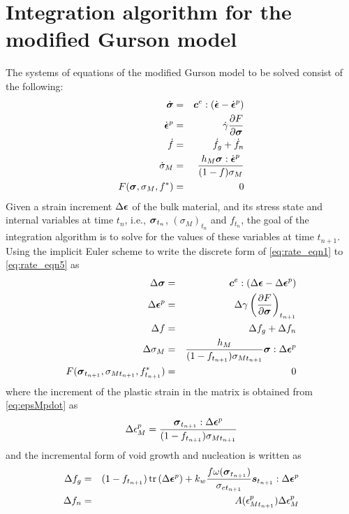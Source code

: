 
\section{Integration algorithm for the modified Gurson model}\label{implicit}
The systems of equations of the modified Gurson model to be solved consist of the following:
\begin{eqnarray}
	\dot{{\boldsymbol{\sigma}}} &=& {\boldsymbol{c}}^e : \left(
        \dot{{\boldsymbol{\epsilon}}} -
        \dot{{\boldsymbol{\epsilon}}}^p\right) \label{eq:rate_eqn1}
        \\ \dot{{\boldsymbol{\epsilon}}}^p &=& \dot{\gamma}\frac{\partial
          F}{\partial{\boldsymbol{\sigma}}} \label{eq:rate_eqn2}\\ \dot{f} &=&
        \dot{f}_g + \dot{f}_n \label{eq:rate_eqn3}\\ \dot{\sigma}_M
        &=& \frac{h_M{\boldsymbol{\sigma}} :
          \dot{{\boldsymbol{\epsilon}}}^p}{(1-f)\sigma_M} \label{eq:rate_eqn4}\\ F({\boldsymbol{\sigma}},
        \sigma_M, f^*) &=& 0 \label{eq:rate_eqn5}
\end{eqnarray}
Given a strain increment $\Delta{\boldsymbol{\epsilon}}$ of the bulk material,
and its stress state and internal variables at time $t_n$, i.e.,
${\boldsymbol{\sigma}}_{t_n}$, $(\sigma_M)_{t_n}$ and $f_{t_n}$, the goal of
the integration algorithm is to solve for the values of these
variables at time $t_{n+1}$. Using the implicit Euler scheme to write
the discrete form of \eqref{eq:rate_eqn1} to \eqref{eq:rate_eqn5} as
\begin{eqnarray}
	\Delta{\boldsymbol{\sigma}} &=& {\boldsymbol{c}}^e : \left( \Delta{\boldsymbol{\epsilon}} -  \Delta{\boldsymbol{\epsilon}}^p\right)  \label{eq:dis_eqn1} \\
	\Delta{\boldsymbol{\epsilon}}^p &=&\Delta\gamma\left( \frac{\partial F}{\partial{\boldsymbol{\sigma}}} \right) _{t_{n+1}} \label{eq:dis_eqn2}\\	
	\Delta f &=&\Delta f_g + \Delta f_n \label{eq:dis_eqn3}\\	
	\Delta\sigma_M &=& \frac{h_M}{(1-f_{t_{n+1}})\sigma_{Mt_{n+1}}}{\boldsymbol{\sigma}}:\Delta{\boldsymbol{\epsilon}}^p \label{eq:dis_eqn4}\\	
	F( {\boldsymbol{\sigma}}_{t_{n+1}}, \sigma_{Mt_{n+1}}, f^*_{t_{n+1}}) &=& 0 \label{eq:dis_eqn5}
\end{eqnarray}
where the increment of the plastic strain in the matrix is obtained from \eqref{eq:epsMpdot} as
\begin{equation}
\Delta\epsilon_M^p = \frac{{\boldsymbol{\sigma}}_{t_{n+1}}:\Delta{\boldsymbol{\epsilon}}^p}{(1-f_{t_{n+1}})\sigma_{Mt_{n+1}}}
\end{equation}
and the incremental form of void growth and nucleation is written as
\begin{eqnarray}
	\Delta f_g &=& (1-f_{t_{n+1}}) \operatorname{\text{tr}} \left( \Delta{\boldsymbol{\epsilon}}^p\right) + k_w\frac{f \omega({\boldsymbol{\sigma}}_{t_{n+1}})}{\sigma_{et_{n+1}}}{\boldsymbol{s}}_{t_{n+1}}: \Delta{\boldsymbol{\epsilon}}^p \\
	\Delta f_n &=&  A(\epsilon_{Mt_{n+1}}^p)\Delta\epsilon_M^p\\	
\end{eqnarray}
